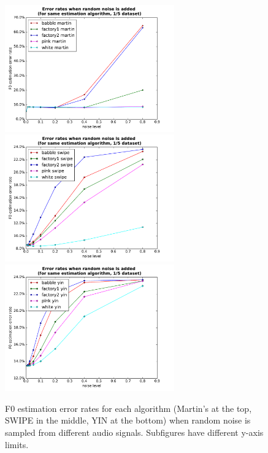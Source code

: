 \documentclass[11pt,a4paper]{report}
\begin{document}
\begin{figure}[htbp]
  \centering
  \includegraphics[width=0.65\textwidth]{error_rates_random_noise_martin.pdf}
  \includegraphics[width=0.65\textwidth]{error_rates_random_noise_swipe.pdf}
  \includegraphics[width=0.65\textwidth]{error_rates_random_noise_yin.pdf}
  \caption[F0 estimation error rates for each algorithm when random noise is sampled from different audio signals.]{F0 estimation error rates for each algorithm (Martin's at the top, SWIPE in the middle, YIN at the bottom) when random noise is sampled from different audio signals.
    Subfigures have different y-axis limits.}
  \label{fig:random-noise-same-algorithm}
\end{figure}
\end{document}
